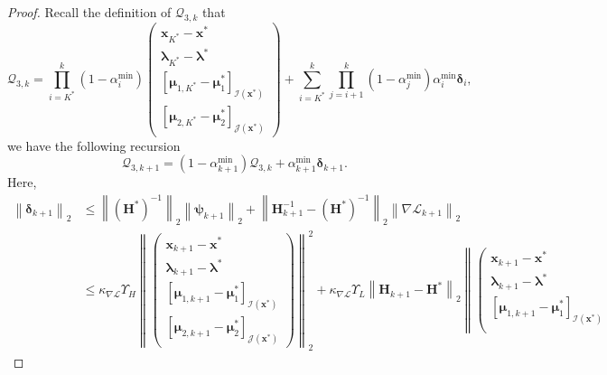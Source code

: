 \documentclass[aos]{imsart}
\numberwithin{equation}{section}
\theoremstyle{plain}
\begin{document}
\begin{appendix}
\begin{proof}
    Recall the definition of $\mathcal{Q}_{3,k}$ that 
    \begin{equation*}
        \mathcal{Q}_{3,k} = \prod_{i=K^{*}}^{k} (1-\alpha^{\min}_i) \left( \begin{array}{c}
        \bm{x}_{K^{*}} - \bm{x}^{*} \\
        \bm{\lambda}_{K^{*}} - \bm{\lambda}^{*}\\
        \left[  \bm{\mu}_{1,K^{*}} - \bm{\mu}_{1}^{*} \right]_{\mathcal{I}(\bm{x}^{*})} \\
        \left[\bm{\mu}_{2,K^{*}} - \bm{\mu}_{2}^{*} \right]_{\mathcal{J}(\bm{x}^{*})}
        \end{array} \right) + \sum_{i=K^{*}}^{k} \prod_{j=i+1}^{k} (1-\alpha^{\min}_j) \alpha^{\min}_i \bm{\delta}_i,
    \end{equation*}
    we have the following recursion 
    \begin{equation}
        \mathcal{Q}_{3,k+1} = \left( 1- \alpha^{\min}_{k+1} \right) \mathcal{Q}_{3,k} + \alpha^{\min}_{k+1}  \bm{\delta}_{k+1}.
    \end{equation}
    Here,
    \begin{equation*}
        \begin{split}
            \left\| \bm{\delta}_{k+1} \right\|_2 & \leq \left\| \left( \bm{H}^{*} \right)^{-1} \right\|_2 \left\| \bm{\psi}_{k+1} \right\|_2 + \left\| \bm{H}_{k+1}^{-1} - \left( \bm{H}^{*} \right)^{-1} \right\|_2 \left\| \nabla \mathcal{L}_{k+1} \right\|_2 \\
            & \leq \kappa_{\nabla \mathcal{L}} \Upsilon_{H}  \left\|  \left( \begin{array}{c}
    \bm{x}_{k+1} - \bm{x}^{*}  \\
    \bm{\lambda}_{k+1} - \bm{\lambda}^{*} \\
    \left[ \bm{\mu}_{1,k+1} - \bm{\mu}_{1}^{*}\right]_{\mathcal{I}(\bm{x}^{*})} \\
    \left[ \bm{\mu}_{2,k+1} - \bm{\mu}_{2}^{*} \right]_{\mathcal{J}(\bm{x}^{*})} 
    \end{array} \right)  \right\|_2^2 + \kappa_{\nabla \mathcal{L}} \Upsilon_{L} \left\| \bm{H}_{k+1} - \bm{H}^{*} \right\|_2  \left\|  \left( \begin{array}{c}
    \bm{x}_{k+1} - \bm{x}^{*}  \\
    \bm{\lambda}_{k+1} - \bm{\lambda}^{*} \\
    \left[ \bm{\mu}_{1,k+1} - \bm{\mu}_{1}^{*}\right]_{\mathcal{I}(\bm{x}^{*})} \\

\end{array}
\end{split}
\end{equation*}
\end{proof}
\end{appendix}
\end{document}
